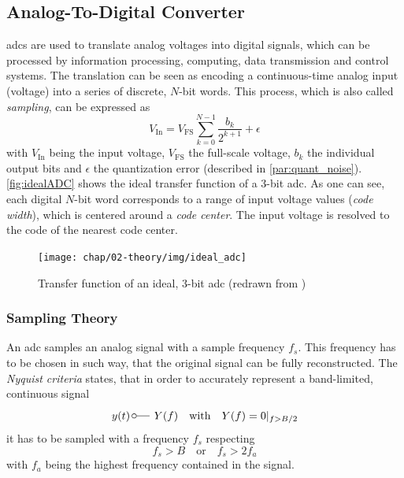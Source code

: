 \subsection{Analog-To-Digital Converter}
\Glspl{adc} are used to translate analog voltages into digital signals, which can be processed by information processing, computing, data transmission and control systems. The translation can be seen as encoding a continuous-time analog input (voltage) into a series of discrete, $N$-bit words. This process, which is also called \textit{sampling}, can be expressed as
\begin{equation}
	V_{\text{In}} = V_{\text{FS}} \sum_{k = 0}^{N-1} \frac{b_k}{2^{k+1}} + \epsilon
\end{equation}
with $V_{\text{In}}$ being the input voltage, $V_{\text{FS}}$ the full-scale voltage, $b_k$ the individual output bits and $\epsilon$ the quantization error (described in \autoref{par:quant_noise}). \autoref{fig:idealADC} shows the ideal transfer function of a 3-bit \gls{adc}. As one can see, each digital $N$-bit word corresponds to a range of input voltage values (\textit{code width}), which is centered around a \textit{code center}. The input voltage is resolved to the code of the nearest code center.
\begin{figure}[H]
	\centering
	\texttt{[image: chap/02-theory/img/ideal\_adc]}
	\caption[Transfer function of ideal, 3-bit ADC]{Transfer function of an ideal, 3-bit \gls{adc} (redrawn from \cite{Lundberg})}
	\label{fig:idealADC}
\end{figure}


\subsubsection*{Sampling Theory}
An \gls{adc} samples an analog signal with a sample frequency $f_s$.
This frequency has to be chosen in such way, that the original signal can be fully reconstructed.
The \textit{Nyquist criteria} states, that in order to accurately represent a band-limited, continuous signal %
\begin{equation}
	y (t) \, \fourier  Y(f) \quad \text{with} \quad Y(f)=0\vert_{f>B/2}
\end{equation}
it has to be sampled with a frequency $f_s$ respecting
\begin{equation}
	f_s > B \quad \text{or} \quad f_s > 2 f_a
\end{equation}
with $f_a$ being the highest frequency contained in the signal. \cite{walt,puente2015}

